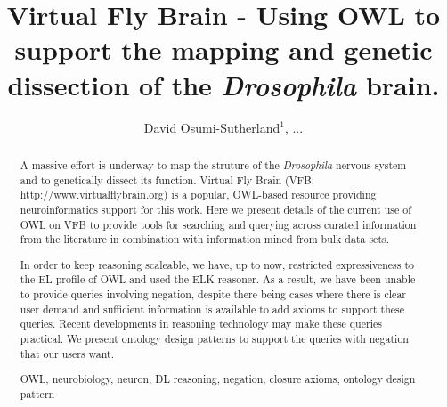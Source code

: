 \documentclass[runningheads,a4paper]{llncs}
\newcommand{\keywords}[1]{\par\addvspace\baselineskip
\noindent\keywordname\enspace\ignorespaces#1}
\begin{document}
\mainmatter  %

\title{Virtual Fly Brain - Using OWL to support the mapping and
  genetic dissection of the \textit{Drosophila} brain.}


%
%
\author{David Osumi-Sutherland$^1$, ...}

%


%
%

\toctitle{}
\tocauthor{}
\maketitle


\begin{abstract}
A massive effort is underway to map the struture of the \textit{Drosophila}
nervous system and to genetically dissect its function. Virtual Fly
Brain (VFB; http://www.virtualflybrain.org) is a popular, OWL-based resource
providing neuroinformatics support for this work.  Here we present
details of the current use of OWL on VFB to provide tools for
searching and querying across curated information from the literature
in combination with information mined from bulk data sets. 

In order to keep reasoning scaleable, we have, up to now, restricted
expressiveness to the EL profile of OWL and used the ELK reasoner. As a result,
we have been unable to provide queries
involving negation, despite there being cases where there is clear
user demand and sufficient information is available to add axioms to 
support these queries. Recent developments in reasoning technology may 
make these queries practical. We present ontology design patterns to 
support the queries with negation that our users want.

\keywords{OWL, neurobiology, neuron, DL reasoning, negation, closure
  axioms, ontology design pattern}
\end{abstract}
\end{document}

